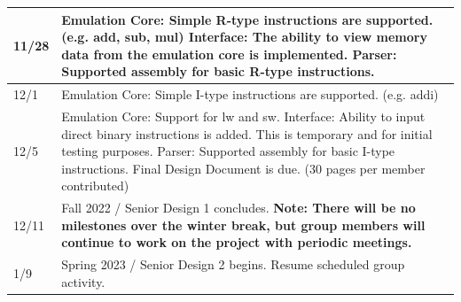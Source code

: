 \documentclass[
    paper=letter,
    parskip=half,
    fontsize=12pt,
    titlepage=firstiscover,
    toc=bibliography,
    numbers=endperiod
]{scrartcl}
\begin{document}
{\begin{tabularx}{\textwidth}{|l|X|}
        11/28         & Emulation Core: Simple R-type instructions are supported. (e.g. add, sub, mul) \newline Interface: The ability to view memory data from the emulation core is implemented. \newline Parser: Supported assembly for basic R-type instructions.                                                                                                                                                                                        \\\hline
        12/1          & Emulation Core: Simple I-type instructions are supported. (e.g. addi)                                                                                                                                                                                                                                                                                                                                                                \\\hline
        12/5          & Emulation Core: Support for lw and sw. \newline Interface: Ability to input direct binary instructions is added. This is temporary and for initial testing purposes. \newline Parser: Supported assembly for basic I-type instructions. \newline Final Design Document is due. (30 pages per member contributed)                                                                                                                     \\\hline
        12/11         & Fall 2022 / Senior Design 1 concludes. \newline \textbf{Note: There will be no milestones over the winter break, but group members will continue to work on the project with periodic meetings.}                                                                                                                                                                                                                                     \\\hline
        1/9           & Spring 2023 / Senior Design 2 begins. Resume scheduled group activity.                                                                                                                                                                                                                                                                                                                                                               \\\hline

\end{tabularx}}
\end{document}
